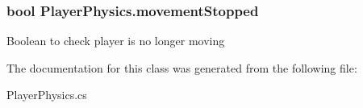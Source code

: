 \hypertarget{classPlayerPhysics_a790c7afaa2da5eef1fe56524bc671dd4}{
\subsubsection[{movement\-Stopped}]{\setlength{\rightskip}{0pt plus 5cm}bool Player\-Physics.\-movement\-Stopped}}\label{classPlayerPhysics_a790c7afaa2da5eef1fe56524bc671dd4}


Boolean to check player is no longer moving 



The documentation for this class was generated from the following file\-:\begin{DoxyCompactItemize}
\item 
Player\-Physics.\-cs\end{DoxyCompactItemize}
